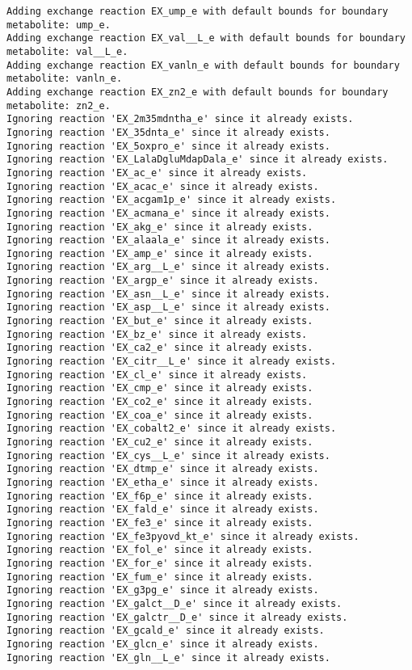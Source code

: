 \documentclass[
  letterpaper,
  DIV=11,
  numbers=noendperiod]{scrartcl}
\begin{document}
\begin{verbatim}
Adding exchange reaction EX_ump_e with default bounds for boundary metabolite: ump_e.
Adding exchange reaction EX_val__L_e with default bounds for boundary metabolite: val__L_e.
Adding exchange reaction EX_vanln_e with default bounds for boundary metabolite: vanln_e.
Adding exchange reaction EX_zn2_e with default bounds for boundary metabolite: zn2_e.
Ignoring reaction 'EX_2m35mdntha_e' since it already exists.
Ignoring reaction 'EX_35dnta_e' since it already exists.
Ignoring reaction 'EX_5oxpro_e' since it already exists.
Ignoring reaction 'EX_LalaDgluMdapDala_e' since it already exists.
Ignoring reaction 'EX_ac_e' since it already exists.
Ignoring reaction 'EX_acac_e' since it already exists.
Ignoring reaction 'EX_acgam1p_e' since it already exists.
Ignoring reaction 'EX_acmana_e' since it already exists.
Ignoring reaction 'EX_akg_e' since it already exists.
Ignoring reaction 'EX_alaala_e' since it already exists.
Ignoring reaction 'EX_amp_e' since it already exists.
Ignoring reaction 'EX_arg__L_e' since it already exists.
Ignoring reaction 'EX_argp_e' since it already exists.
Ignoring reaction 'EX_asn__L_e' since it already exists.
Ignoring reaction 'EX_asp__L_e' since it already exists.
Ignoring reaction 'EX_but_e' since it already exists.
Ignoring reaction 'EX_bz_e' since it already exists.
Ignoring reaction 'EX_ca2_e' since it already exists.
Ignoring reaction 'EX_citr__L_e' since it already exists.
Ignoring reaction 'EX_cl_e' since it already exists.
Ignoring reaction 'EX_cmp_e' since it already exists.
Ignoring reaction 'EX_co2_e' since it already exists.
Ignoring reaction 'EX_coa_e' since it already exists.
Ignoring reaction 'EX_cobalt2_e' since it already exists.
Ignoring reaction 'EX_cu2_e' since it already exists.
Ignoring reaction 'EX_cys__L_e' since it already exists.
Ignoring reaction 'EX_dtmp_e' since it already exists.
Ignoring reaction 'EX_etha_e' since it already exists.
Ignoring reaction 'EX_f6p_e' since it already exists.
Ignoring reaction 'EX_fald_e' since it already exists.
Ignoring reaction 'EX_fe3_e' since it already exists.
Ignoring reaction 'EX_fe3pyovd_kt_e' since it already exists.
Ignoring reaction 'EX_fol_e' since it already exists.
Ignoring reaction 'EX_for_e' since it already exists.
Ignoring reaction 'EX_fum_e' since it already exists.
Ignoring reaction 'EX_g3pg_e' since it already exists.
Ignoring reaction 'EX_galct__D_e' since it already exists.
Ignoring reaction 'EX_galctr__D_e' since it already exists.
Ignoring reaction 'EX_gcald_e' since it already exists.
Ignoring reaction 'EX_glcn_e' since it already exists.
Ignoring reaction 'EX_gln__L_e' since it already exists.

\end{verbatim}
\end{document}
